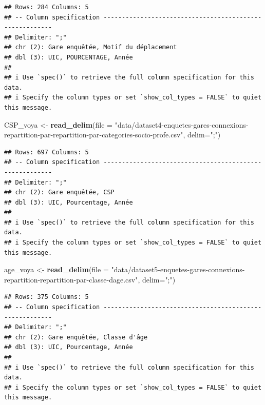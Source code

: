\documentclass[
]{article}
\newenvironment{Shaded}{\begin{snugshade}}{\end{snugshade}}
\newcommand{\AttributeTok}[1]{\textcolor[rgb]{0.13,0.29,0.53}{#1}}
\newcommand{\FunctionTok}[1]{\textcolor[rgb]{0.13,0.29,0.53}{\textbf{#1}}}
\newcommand{\NormalTok}[1]{#1}
\newcommand{\OtherTok}[1]{\textcolor[rgb]{0.56,0.35,0.01}{#1}}
\newcommand{\StringTok}[1]{\textcolor[rgb]{0.31,0.60,0.02}{#1}}
\begin{document}
\begin{verbatim}
## Rows: 284 Columns: 5
## -- Column specification --------------------------------------------------------
## Delimiter: ";"
## chr (2): Gare enquêtée, Motif du déplacement
## dbl (3): UIC, POURCENTAGE, Année
## 
## i Use `spec()` to retrieve the full column specification for this data.
## i Specify the column types or set `show_col_types = FALSE` to quiet this message.
\end{verbatim}

\begin{Shaded}
\begin{Highlighting}[]
\NormalTok{CSP\_voya }\OtherTok{\textless{}{-}} \FunctionTok{read\_delim}\NormalTok{(}\AttributeTok{file =} \StringTok{"data/dataset4{-}enquetes{-}gares{-}connexions{-}repartition{-}par{-}repartition{-}par{-}categories{-}socio{-}profe.csv"}\NormalTok{, }\AttributeTok{delim=}\StringTok{";"}\NormalTok{)}
\end{Highlighting}
\end{Shaded}

\begin{verbatim}
## Rows: 697 Columns: 5
## -- Column specification --------------------------------------------------------
## Delimiter: ";"
## chr (2): Gare enquêtée, CSP
## dbl (3): UIC, Pourcentage, Année
## 
## i Use `spec()` to retrieve the full column specification for this data.
## i Specify the column types or set `show_col_types = FALSE` to quiet this message.
\end{verbatim}

\begin{Shaded}
\begin{Highlighting}[]
\NormalTok{age\_voya }\OtherTok{\textless{}{-}} \FunctionTok{read\_delim}\NormalTok{(}\AttributeTok{file =} \StringTok{"data/dataset5{-}enquetes{-}gares{-}connexions{-}repartition{-}repartition{-}par{-}classe{-}dage.csv"}\NormalTok{, }\AttributeTok{delim=}\StringTok{";"}\NormalTok{)}
\end{Highlighting}
\end{Shaded}

\begin{verbatim}
## Rows: 375 Columns: 5
## -- Column specification --------------------------------------------------------
## Delimiter: ";"
## chr (2): Gare enquêtée, Classe d'âge
## dbl (3): UIC, Pourcentage, Année
## 
## i Use `spec()` to retrieve the full column specification for this data.
## i Specify the column types or set `show_col_types = FALSE` to quiet this message.
\end{verbatim}
\end{document}
